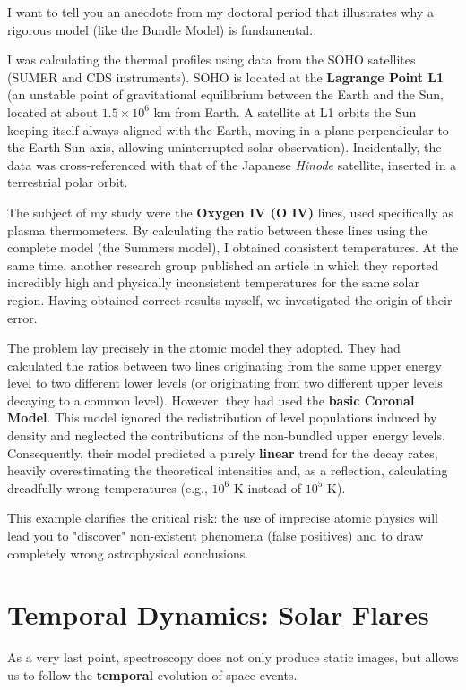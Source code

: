 I want to tell you an anecdote from my doctoral period that illustrates why a rigorous model (like the Bundle Model) is fundamental.

I was calculating the thermal profiles using data from the SOHO satellites (SUMER and CDS instruments). SOHO is located at the \textbf{Lagrange Point L1} (an unstable point of gravitational equilibrium between the Earth and the Sun, located at about $1.5 \times 10^6\text{ km}$ from Earth. A satellite at L1 orbits the Sun keeping itself always aligned with the Earth, moving in a plane perpendicular to the Earth-Sun axis, allowing uninterrupted solar observation). Incidentally, the data was cross-referenced with that of the Japanese \textit{Hinode} satellite, inserted in a terrestrial polar orbit.

The subject of my study were the \textbf{Oxygen IV (O IV)} lines, used specifically as plasma thermometers. By calculating the ratio between these lines using the complete model (the Summers model), I obtained consistent temperatures.
At the same time, another research group published an article in which they reported incredibly high and physically inconsistent temperatures for the same solar region. Having obtained correct results myself, we investigated the origin of their error.

The problem lay precisely in the atomic model they adopted. They had calculated the ratios between two lines originating from the same upper energy level to two different lower levels (or originating from two different upper levels decaying to a common level). However, they had used the \textbf{basic Coronal Model}. This model ignored the redistribution of level populations induced by density and neglected the contributions of the non-bundled upper energy levels. Consequently, their model predicted a purely \textbf{linear} trend for the decay rates, heavily overestimating the theoretical intensities and, as a reflection, calculating dreadfully wrong temperatures (e.g., $10^6\text{ K}$ instead of $10^5\text{ K}$).

This example clarifies the critical risk: the use of imprecise atomic physics will lead you to "discover" non-existent phenomena (false positives) and to draw completely wrong astrophysical conclusions.

\section{Temporal Dynamics: Solar Flares}

As a very last point, spectroscopy does not only produce static images, but allows us to follow the \textbf{temporal} evolution of space events.

